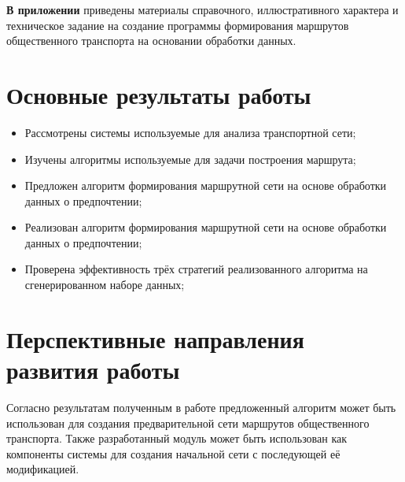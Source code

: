 \textbf{В приложении} приведены материалы справочного, иллюстративного характера и техническое задание на 
создание программы формирования маршрутов общественного транспорта на основании обработки данных.

\section{Основные результаты работы}
\begin{itemize}
    \item Рассмотрены системы используемые для анализа транспортной сети;
    \item Изучены алгоритмы используемые для задачи построения маршрута;
    \item Предложен алгоритм формирования маршрутной сети на основе обработки данных о предпочтении;
    \item Реализован алгоритм формирования маршрутной сети на основе обработки данных о предпочтении;
    \item Проверена эффективность трёх стратегий реализованного алгоритма на сгенерированном наборе данных;
\end{itemize}

\section{Перспективные направления развития работы}
Согласно результатам полученным в работе предложенный алгоритм может быть использован для создания 
предварительной сети маршрутов общественного транспорта. Также разработанный модуль может быть использован 
как компоненты системы для создания начальной сети с последующей её модификацией.

